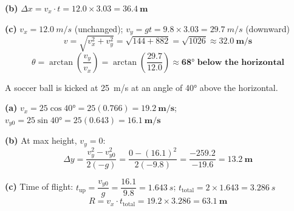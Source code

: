 \documentclass[addpoints]{exam}
\begin{document}
\begin{questions}
\begin{solution}[9cm]
\textbf{(b)} $\Delta x = v_x \cdot t = 12.0 \times 3.03 = \mathbf{\SI{36.4}{m}}$

\textbf{(c)} $v_x = \SI{12.0}{m/s}$ (unchanged);\quad
$v_y = gt = 9.8 \times 3.03 = \SI{29.7}{m/s}$ (downward)
\[
v = \sqrt{v_x^2 + v_y^2} = \sqrt{144 + 882} = \sqrt{1026} \approx \mathbf{\SI{32.0}{m/s}}
\]
\[
\theta = \arctan\!\left(\frac{v_y}{v_x}\right) = \arctan\!\left(\frac{29.7}{12.0}\right)
\approx \mathbf{\ang{68} \text{ below the horizontal}}
\]
\end{solution}

\question A soccer ball is kicked at \SI{25}{m/s} at an angle of \ang{40} above the
horizontal.
\begin{solution}[9cm]
\textbf{(a)} $v_x = 25\cos\ang{40} = 25(0.766) = \mathbf{\SI{19.2}{m/s}}$;\quad
$v_{y0} = 25\sin\ang{40} = 25(0.643) = \mathbf{\SI{16.1}{m/s}}$

\textbf{(b)} At max height, $v_y = 0$:
\[
\Delta y = \frac{v_y^2 - v_{y0}^2}{2(-g)} = \frac{0 - (16.1)^2}{2(-9.8)}
= \frac{-259.2}{-19.6} = \mathbf{\SI{13.2}{m}}
\]

\textbf{(c)} Time of flight: $t_\text{up} = \dfrac{v_{y0}}{g} = \dfrac{16.1}{9.8} = \SI{1.643}{s}$;\quad
$t_\text{total} = 2 \times 1.643 = \SI{3.286}{s}$
\[
R = v_x \cdot t_\text{total} = 19.2 \times 3.286 = \mathbf{\SI{63.1}{m}}
\]
\end{solution}

\end{questions}
\end{document}
